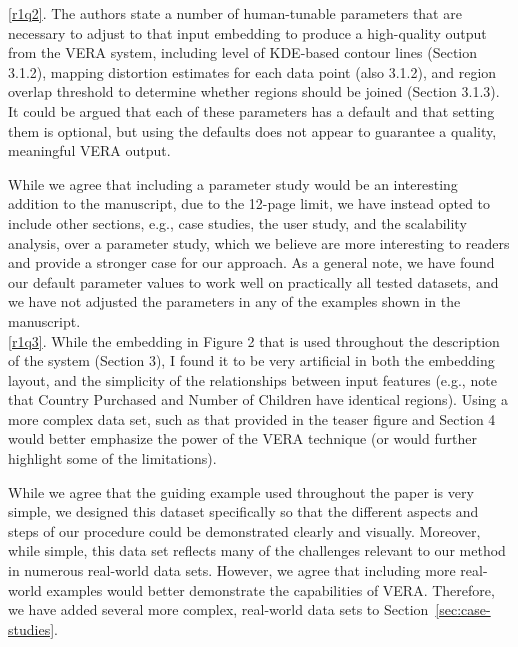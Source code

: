 \documentclass{article}
\newcounter{rtaskno}
\newcommand{\rtask}[1]{\refstepcounter{rtaskno}\label{#1}}
\newcommand{\reviewc}[2]{\begin{leftbar}\noindent\rtask{#1}\ref{#1}. #2\end{leftbar}}
\newcommand{\answer}[1]{\noindent #1\\[0mm]}
\newlength{\leftbarwidth}
\newlength{\leftbarsep}
\renewenvironment{leftbar}{%
    \def\FrameCommand{{\color{black}{\vrule width \leftbarwidth\relax\hspace {\leftbarsep}}}}%
    \MakeFramed {\advance \hsize -\width \FrameRestore }%
}{\endMakeFramed}
\begin{document}


\reviewc{r1q2}{The authors state a number of human-tunable parameters that are necessary to adjust to that input embedding to produce a high-quality output from the VERA system, including level of KDE-based contour lines (Section 3.1.2), mapping distortion estimates for each data point (also 3.1.2), and region overlap threshold to determine whether regions should be joined (Section 3.1.3).  It could be argued that each of these parameters has a default and that setting them is optional, but using the defaults does not appear to guarantee a quality, meaningful VERA output.}

\answer{While we agree that including a parameter study would be an interesting addition to the manuscript, due to the 12-page limit, we have instead opted to include other sections, e.g., case studies, the user study, and the scalability analysis, over a parameter study, which we believe are more interesting to readers and provide a stronger case for our approach. As a general note, we have found our default parameter values to work well on practically all tested datasets, and we have not adjusted the parameters in any of the examples shown in the manuscript.}


\reviewc{r1q3}{While the embedding in Figure 2 that is used throughout the description of the system (Section 3), I found it to be very artificial in both the embedding layout, and the simplicity of the relationships between input features (e.g., note that Country Purchased and Number of Children have identical regions).  Using a more complex data set, such as that provided in the teaser figure and Section 4 would better emphasize the power of the VERA technique (or would further highlight some of the limitations).}

\answer{While we agree that the guiding example used throughout the paper is very simple, we designed this dataset specifically so that the different aspects and steps of our procedure could be demonstrated clearly and visually. Moreover, while simple, this data set reflects many of the challenges relevant to our method in numerous real-world data sets. However, we agree that including more real-world examples would better demonstrate the capabilities of VERA. Therefore, we have added several more complex, real-world data sets to Section~\ref{sec:case-studies}.}
\end{document}
